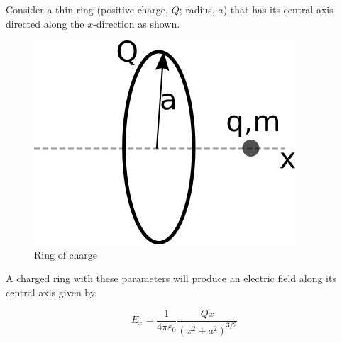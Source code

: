 \documentclass[11pt]{article}
\begin{document}
Consider a thin ring (positive charge, \(Q\); radius, \(a\)) that has
its central axis directed along the \(x\)-direction as shown.

\begin{figure}[htbp]
\centering
\includegraphics{./images/hw2/ring_w_charge.png}
\caption{Ring of charge}
\end{figure}

A charged ring with these parameters will produce an electric field
along its central axis given by,

\[E_x = \dfrac{1}{4\pi\varepsilon_0}\dfrac{Qx}{\left(x^2+a^2\right)^{3/2}}\]
\end{document}
